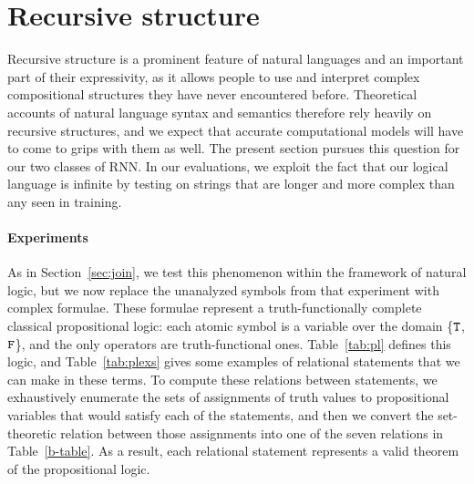 \section{Recursive structure}\label{sec:recursion}

Recursive structure is a prominent feature of natural languages and an
important part of their expressivity, as it allows people to use and
interpret complex compositional structures they have never encountered before.
Theoretical accounts of natural language syntax and semantics
therefore rely heavily on recursive structures, and we expect that
accurate computational models will have to come to grips with them as
well. The present section pursues this question for our two classes of
RNN. In our evaluations, we exploit the fact that our logical language
is infinite by testing on strings that are longer and more complex
than any seen in training.


\paragraph{Experiments}
As in Section~\ref{sec:join}, we test this phenomenon within the
framework of natural logic, but we now replace the unanalyzed symbols
from that experiment with complex formulae. These formulae
represent a truth-functionally complete classical propositional logic:
each atomic symbol is a variable over the domain \{$\texttt{T}$, $\texttt{F}$\}, and the only
operators are truth-functional ones.  Table~\ref{tab:pl} defines this
logic, and Table~\ref{tab:plexs} gives some examples of relational
statements that we can make in these terms. To compute these relations
between statements, we exhaustively enumerate the sets of assignments
of truth values to propositional variables that would satisfy each of
the statements, and then we convert the set-theoretic relation between
those assignments into one of the seven relations in
Table~\ref{b-table}. As a result, each relational statement represents
a valid theorem of the propositional logic.

